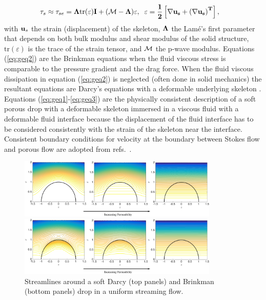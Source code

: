 \documentclass[11pt]{article}
\begin{document}
\begin{align}
\tau_s &\approx \tau_{se} = \bf{\Lambda}\mbox{tr}(\bf{\varepsilon}) \bf{I} + ({\cal M}-\Lambda) \bf{\varepsilon},\;\; 
{\bf \varepsilon} = \frac{1}{2}\left[\nabla {\bf u}_s + \left(\nabla {\bf u}_s\right)^T\right],
\end{align}
with ${\bf u}_s$ the strain (displacement) of the skeleton, ${\bf
\Lambda}$ the Lam\'e's first parameter that depends on both bulk modulus
and shear modulus of the solid structure, $\mbox{tr}(\varepsilon)$ is
the trace of the strain tensor, and ${\cal M}$ the p-wave modulus.
Equations (\ref{eq:geq2}) are the Brinkman equations when the fluid
viscous stress is comparable to the pressure gradient and the drag
force.  When the fluid viscous dissipation in equation (\ref{eq:geq2})
is neglected (often done in solid mechanics) the resultant equations are
Darcy's equations with a deformable underlying skeleton
\cite{MacMinn2016_PRApplied}. Equations (\ref{eq:geq1}-\ref{eq:geq3})
are the physically consistent description of a soft porous drop with a
deformable skeleton immersed in a viscous fluid with a deformable fluid
interface because the displacement of the fluid interface has to be
considered consistently with the strain of the skeleton near the
interface. Consistent boundary conditions for velocity at the boundary
between Stokes flow and porous flow are adopted from
refs.~\cite{Angot2017_PRE, MacMinn2016_PRApplied}.
%
\begin{figure}
\centerline{\includegraphics[width=3.75in]{figs/DarcyDropUFlow0927aa.pdf}}
\smallskip\par
\centerline{\includegraphics[width=3.75in]{figs/BrinkmanDropUFlow0927aa.pdf}}
\vspace{-7pt}
\caption{\label{fig:DarcyDropUFlow0927} Streamlines around a soft Darcy
  (top panels) and Brinkman (bottom panels) drop in a uniform streaming
  flow.}
\end{figure}
\end{document}
